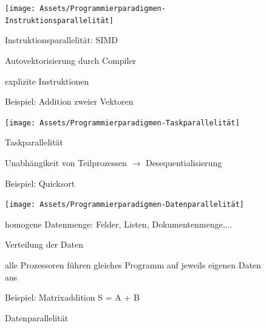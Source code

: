 \documentclass[10pt]{article}
\begin{document}
  \begin{figure}[!tbp]
    \centering
    \begin{minipage}[b]{0.45\textwidth}
      \texttt{[image: Assets/Programmierparadigmen-Instruktionsparallelität]}
      \caption{Instruktionsparallelität: SIMD}
      \begin{itemize*}
        \item Autovektorisierung durch Compiler
        \item explizite Instruktionen
        \item Beispiel: Addition zweier Vektoren
      \end{itemize*}
    \end{minipage}
    \hfill
    \begin{minipage}[b]{0.45\textwidth}
      \texttt{[image: Assets/Programmierparadigmen-Taskparallelität]}
      \caption{Taskparallelität}
      \begin{itemize*}
        \item Unabhängikeit von Teilprozessen $\rightarrow$ Desequentialisierung
        \item Beispiel: Quicksort
      \end{itemize*}
    \end{minipage}
    \vfill
    \begin{minipage}[b]{0.45\textwidth}
      \texttt{[image: Assets/Programmierparadigmen-Datenparallelität]}
      \caption{Datenparallelität}
      \begin{itemize*}
        \item homogene Datenmenge: Felder, Listen, Dokumentenmenge,...
        \item Verteilung der Daten
        \item alle Prozessoren führen gleiches Programm auf jeweils eigenen Daten aus
        \item Beispiel: Matrixaddition S = A + B
      \end{itemize*}
    \end{minipage}
  \end{figure}
  
\end{document}
